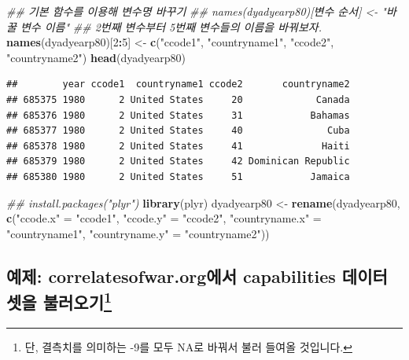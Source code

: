 \documentclass[]{book}
\newenvironment{Shaded}{\begin{snugshade}}{\end{snugshade}}
\newcommand{\CommentTok}[1]{\textcolor[rgb]{0.56,0.35,0.01}{\textit{#1}}}
\newcommand{\DecValTok}[1]{\textcolor[rgb]{0.00,0.00,0.81}{#1}}
\newcommand{\KeywordTok}[1]{\textcolor[rgb]{0.13,0.29,0.53}{\textbf{#1}}}
\newcommand{\NormalTok}[1]{#1}
\newcommand{\OperatorTok}[1]{\textcolor[rgb]{0.81,0.36,0.00}{\textbf{#1}}}
\newcommand{\StringTok}[1]{\textcolor[rgb]{0.31,0.60,0.02}{#1}}
\let\rmarkdownfootnote\footnote%
\def\footnote{\protect\rmarkdownfootnote}
\begin{document}
\begin{Shaded}
\begin{Highlighting}[]
\CommentTok{## 기본 함수를 이용해 변수명 바꾸기}
\CommentTok{## names(dyadyearp80)[변수 순서] <- "바꿀 변수 이름"}
\CommentTok{## 2번째 변수부터 5번째 변수들의 이름을 바꿔보자.}
\KeywordTok{names}\NormalTok{(dyadyearp80)[}\DecValTok{2}\OperatorTok{:}\DecValTok{5}\NormalTok{] <-}\StringTok{ }\KeywordTok{c}\NormalTok{(}\StringTok{"ccode1"}\NormalTok{, }\StringTok{"countryname1"}\NormalTok{, }
                             \StringTok{"ccode2"}\NormalTok{, }\StringTok{"countryname2"}\NormalTok{)}
\KeywordTok{head}\NormalTok{(dyadyearp80)}
\end{Highlighting}
\end{Shaded}

\begin{verbatim}
##        year ccode1  countryname1 ccode2       countryname2
## 685375 1980      2 United States     20             Canada
## 685376 1980      2 United States     31            Bahamas
## 685377 1980      2 United States     40               Cuba
## 685378 1980      2 United States     41              Haiti
## 685379 1980      2 United States     42 Dominican Republic
## 685380 1980      2 United States     51            Jamaica
\end{verbatim}

\begin{Shaded}
\begin{Highlighting}[]
\CommentTok{## install.packages("plyr")}
\KeywordTok{library}\NormalTok{(plyr)}
\NormalTok{dyadyearp80 <-}\StringTok{ }\KeywordTok{rename}\NormalTok{(dyadyearp80, }\KeywordTok{c}\NormalTok{(}\StringTok{"ccode.x"}\NormalTok{ =}\StringTok{ "ccode1"}\NormalTok{, }
                                     \StringTok{"ccode.y"}\NormalTok{ =}\StringTok{ "ccode2"}\NormalTok{,}
                                     \StringTok{"countryname.x"}\NormalTok{ =}\StringTok{ "countryname1"}\NormalTok{,}
                                     \StringTok{"countryname.y"}\NormalTok{ =}\StringTok{ "countryname2"}\NormalTok{))}
\end{Highlighting}
\end{Shaded}

\hypertarget{uxc608uxc81c-correlatesofwar.orguxc5d0uxc11c-capabilities-uxb370uxc774uxd130uxc14buxc744-uxbd88uxb7ecuxc624uxae303-3}{%
\subsection[예제: correlatesofwar.org에서 capabilities 데이터셋을 불러오기]{\texorpdfstring{예제: correlatesofwar.org에서 capabilities 데이터셋을 불러오기\footnote{단, 결측치를 의미하는 -9를 모두 NA로 바꿔서 불러 들여올 것입니다.}}{예제: correlatesofwar.org에서 capabilities 데이터셋을 불러오기}}\label{uxc608uxc81c-correlatesofwar.orguxc5d0uxc11c-capabilities-uxb370uxc774uxd130uxc14buxc744-uxbd88uxb7ecuxc624uxae303-3}}
\end{document}

